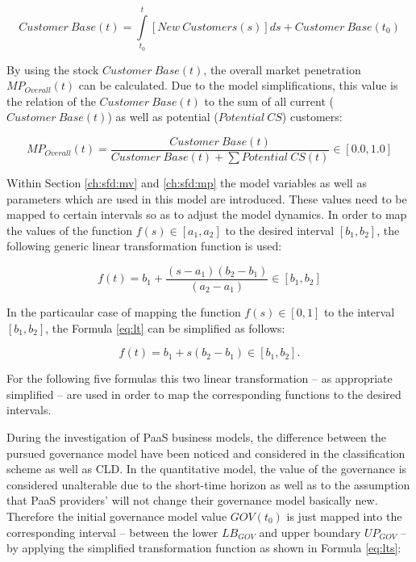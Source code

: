 \begin{equation}\label{eq:cb}
	\mathit{Customer~Base(t)} = \int\limits_{t_0}^t \mathit{[New~Customers(s)]ds} + \mathit{Customer~Base(t_0)}
\end{equation}

By using the stock $Customer~Base(t)$, the overall market penetration $MP_{Overall}(t)$ can be calculated. Due to the model simplifications, this value is the relation of the $Customer~Base(t)$ to the sum of all current ($Customer~Base(t)$) as well as potential ($Potential~CS$) customers:

\begin{equation}\label{eq:mpo}
	MP_{Overall}(t) = \frac{\mathit{Customer~Base(t)}}{\mathit{Customer~Base(t)} + \sum \mathit{Potential~CS(t)}} \in [0.0,1.0]
\end{equation}

Within Section \ref{ch:sfd:mv} and \ref{ch:sfd:mp} the model variables as well as parameters which are used in this model are introduced. These values need to be mapped to certain intervals so as to adjust the model dynamics. In order to map the values of the function $f(s) \in [a_1,a_2]$ to the desired interval $[b_1,b_2]$, the following generic linear transformation function is used:

\begin{equation}\label{eq:lt}
	f(t) = b_{1} + \frac{(s-a_1)(b_2-b_1)}{(a_2-a_1)} \in [b_1,b_2]
\end{equation}

In the particaular case of mapping the function $f(s) \in [0,1]$ to the interval $[b_1,b_2]$, the Formula \ref{eq:lt} can be simplified as follows:

\begin{equation}\label{eq:lts}
	f(t) = b_{1} + s (b_{2}-b_{1}) \in [b_{1},b_{2}].
\end{equation}

For the following five formulas this two linear transformation -- as appropriate simplified -- are used in order to map the corresponding functions to the desired intervals.

During the investigation of \ac{PaaS} business models, the difference between the pursued governance model have been noticed and considered in the classification scheme as well as \ac{CLD}. In the quantitative model, the value of the governance is considered unalterable due to the short-time horizon as well as to the assumption that \ac{PaaS} providers' will not change their governance model basically new. Therefore the initial governance model value $GOV(t_0)$ is just mapped into the corresponding interval -- between the lower $LB_{GOV}$ and upper boundary $UP_{GOV}$ -- by applying the simplified transformation function as shown in Formula \ref{eq:lts}:


